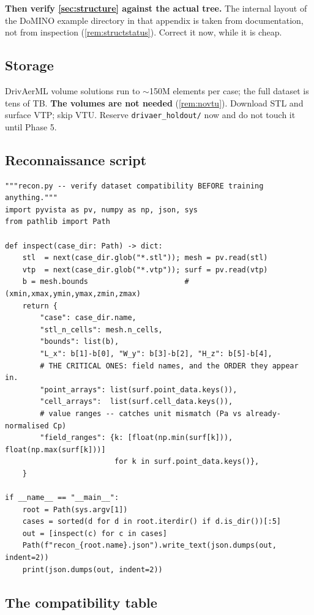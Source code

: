 \documentclass[10pt,a4paper]{article}
\theoremstyle{definition}
\begin{document}
\textbf{Then verify \cref{sec:structure} against the actual tree.} The internal layout
of the DoMINO example directory in that appendix is taken from documentation, not from
inspection (\cref{rem:structstatus}). Correct it now, while it is cheap.

\subsection{Storage}

DrivAerML volume solutions run to $\sim$150M elements per case; the full dataset is
tens of TB. \textbf{The volumes are not needed} (\cref{rem:novtu}). Download STL and
surface VTP; skip VTU. Reserve \texttt{drivaer\_holdout/} now and do not touch it until
Phase 5.

\subsection{Reconnaissance script}

\begin{lstlisting}
"""recon.py -- verify dataset compatibility BEFORE training anything."""
import pyvista as pv, numpy as np, json, sys
from pathlib import Path

def inspect(case_dir: Path) -> dict:
    stl  = next(case_dir.glob("*.stl")); mesh = pv.read(stl)
    vtp  = next(case_dir.glob("*.vtp")); surf = pv.read(vtp)
    b = mesh.bounds                      # (xmin,xmax,ymin,ymax,zmin,zmax)
    return {
        "case": case_dir.name,
        "stl_n_cells": mesh.n_cells,
        "bounds": list(b),
        "L_x": b[1]-b[0], "W_y": b[3]-b[2], "H_z": b[5]-b[4],
        # THE CRITICAL ONES: field names, and the ORDER they appear in.
        "point_arrays": list(surf.point_data.keys()),
        "cell_arrays":  list(surf.cell_data.keys()),
        # value ranges -- catches unit mismatch (Pa vs already-normalised Cp)
        "field_ranges": {k: [float(np.min(surf[k])), float(np.max(surf[k]))]
                         for k in surf.point_data.keys()},
    }

if __name__ == "__main__":
    root = Path(sys.argv[1])
    cases = sorted(d for d in root.iterdir() if d.is_dir())[:5]
    out = [inspect(c) for c in cases]
    Path(f"recon_{root.name}.json").write_text(json.dumps(out, indent=2))
    print(json.dumps(out, indent=2))
\end{lstlisting}

\subsection{The compatibility table}
\end{document}
